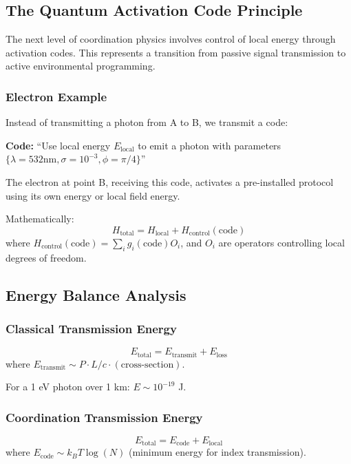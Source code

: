 \documentclass[11pt,a4paper]{article}
\begin{document}
	\subsection{The Quantum Activation Code Principle}
	
	The next level of coordination physics involves control of local energy through activation codes. This represents a transition from passive signal transmission to active environmental programming.
	
	\subsubsection{Electron Example}
	Instead of transmitting a photon from A to B, we transmit a code:
	
	\textbf{Code:} ``Use local energy $E_{\text{local}}$ to emit a photon with parameters $\{\lambda=532\text{nm}, \sigma=10^{-3}, \phi=\pi/4\}$''
	
	The electron at point B, receiving this code, activates a pre-installed protocol using its own energy or local field energy.
	
	Mathematically:
	\begin{equation}
		H_{\text{total}} = H_{\text{local}} + H_{\text{control}}(\text{code})
	\end{equation}
	where $H_{\text{control}}(\text{code}) = \sum_i g_i(\text{code}) O_i$, and $O_i$ are operators controlling local degrees of freedom.
	
	\subsection{Energy Balance Analysis}
	
	\subsubsection{Classical Transmission Energy}
	\begin{equation}
		E_{\text{total}} = E_{\text{transmit}} + E_{\text{loss}}
	\end{equation}
	where $E_{\text{transmit}} \sim P \cdot L/c \cdot (\text{cross-section})$.
	
	For a 1 eV photon over 1 km: $E \sim 10^{-19}$ J.
	
	\subsubsection{Coordination Transmission Energy}
	\begin{equation}
		E_{\text{total}} = E_{\text{code}} + E_{\text{local}}
	\end{equation}
	where $E_{\text{code}} \sim k_B T \log(N)$ (minimum energy for index transmission).
	
\end{document}

